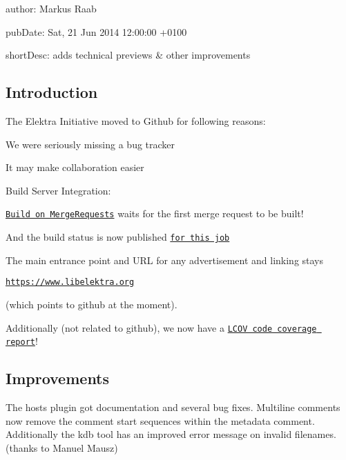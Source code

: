 
\begin{DoxyItemize}
\item author\+: Markus Raab
\item pub\+Date\+: Sat, 21 Jun 2014 12\+:00\+:00 +0100
\item short\+Desc\+: adds technical previews \& other improvements
\end{DoxyItemize}

\subsection*{Introduction}

The Elektra Initiative moved to Github for following reasons\+:


\begin{DoxyItemize}
\item We were seriously missing a bug tracker
\item It may make collaboration easier
\item Build Server Integration\+:
\begin{DoxyItemize}
\item \href{https://build.libelektra.org/job/elektra-mergerequests/}{\tt Build on Merge\+Requests} waits for the first merge request to be built!
\item And the build status is now published \href{https://build.libelektra.org/job/elektra-gcc47-all/}{\tt for this job}
\end{DoxyItemize}
\end{DoxyItemize}

The main entrance point and U\+RL for any advertisement and linking stays

\href{https://www.libelektra.org}{\tt https\+://www.\+libelektra.\+org}

(which points to github at the moment).

Additionally (not related to github), we now have a \href{https://doc.libelektra.org/coverage/master/debian-stable-full}{\tt L\+C\+OV code coverage report}!

\subsection*{Improvements}

The hosts plugin got documentation and several bug fixes. Multiline comments now remove the comment start sequences within the metadata comment. Additionally the kdb tool has an improved error message on invalid filenames. (thanks to Manuel Mausz)

